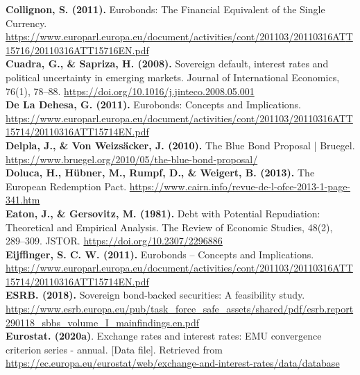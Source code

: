 \textbf{Collignon, S. (2011).} Eurobonds: The Financial Equivalent of the Single Currency. \url{https://www.europarl.europa.eu/document/activities/cont/201103/20110316AT}\linebreak\url{T15716/20110316ATT15716EN.pdf}\\

\textbf{Cuadra, G., \& Sapriza, H. (2008).} Sovereign default, interest rates and political uncertainty in emerging markets. Journal of International Economics, 76(1), 78–88. \url{https://doi.org/10.1016/j.jinteco.2008.05.001}\\

\textbf{De La Dehesa, G. (2011).} Eurobonds: Concepts and Implications. \url{https://www.europarl.europa.eu/document/activities/cont/201103/20110}\linebreak\url{316ATT15714/20110316ATT15714EN.pdf}\\

\textbf{Delpla, J., \& Von Weizsäcker, J. (2010).} The Blue Bond Proposal | Bruegel. \url{https://www.bruegel.org/2010/05/the-blue-bond-proposal/}\\

\textbf{Doluca, H., Hübner, M., Rumpf, D., \& Weigert, B. (2013).} The European Redemption Pact. \url{https://www.cairn.info/revue-de-l-ofce-2013-1-page-341.htm}\\

\textbf{Eaton, J., \& Gersovitz, M. (1981).} Debt with Potential Repudiation: Theoretical and Empirical Analysis. The Review of Economic Studies, 48(2), 289–309. JSTOR. \url{https://doi.org/10.2307/2296886}\\

\textbf{Eijffinger, S. C. W. (2011).} Eurobonds – Concepts and Implications. \url{https://www.europarl.europa.eu/document/activities/cont/201103/20110316ATT15714/2011}\linebreak\url{0316ATT15714EN.pdf}\\

\textbf{ESRB. (2018).} Sovereign bond-backed securities: A feasibility study. \url{https://www.esrb.europa.eu/pub/task_force_safe_assets/shared/pdf/esrb.report290118_sbbs_volume_I_mainfindings.en.pdf}\\

\textbf{Eurostat. (2020a)}. Exchange rates and interest rates: EMU convergence criterion series - annual. [Data file]. Retrieved from \url{https://ec.europa.eu/eurostat/web/exchange-and-interest-rates/data/database}\\ 

